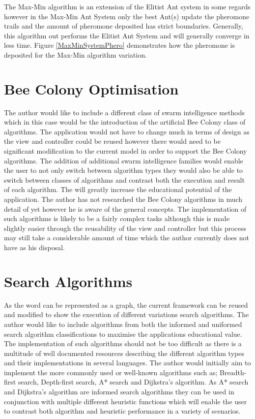 The Max-Min algorithm is an extension of the Elitist Ant system in some regards however in the Max-Min Ant System only the best Ant(s) update the pheromone trails and the amount of pheromone deposited has strict boundaries. Generally, this algorithm out performs the Elitist Ant System and will generally converge in less time. Figure \ref{MaxMinSystemPhero} demonstrates how the pheromone is deposited for the Max-Min algorithm variation.

\section{Bee Colony Optimisation}

The author would like to include a different class of swarm intelligence methods which in this case would be the introduction of the artificial Bee Colony class of algorithms. The application would not have to change much in terms of design as the view and controller could be reused however there would need to be significant modification to the current model in order to support the Bee Colony algorithms. The addition of additional swarm intelligence families would enable the user to not only switch between algorithm types they would also be able to switch between classes of algorithms and contrast both the execution and result of each algorithm. The will greatly increase the educational potential of the application. The author has not researched the Bee Colony algorithms in much detail of yet however he is aware of the general concepts. The implementation of such algorithms is likely to be a fairly complex tasks although this is made slightly easier through the reusability of the view and controller but this process may still take a considerable amount of time which the author currently does not have as his disposal.

\section{Search Algorithms}

As the word can be represented as a graph, the current framework can be reused and modified to show the execution of different variations search algorithms. The author would like to include algorithms from both the informed and uniformed search algorithm classifications to maximise the applications educational value. The implementation of such algorithms should not be too difficult as there is a multitude of well documented resources describing the different algorithm types and their implementations in several languages. The author would initially aim to implement the more commonly used or well-known algorithms such as; Breadth-first search, Depth-first search, A* search and Dijkstra's algorithm. As A* search and Dijkstra's algorithm are informed search algorithms they can be used in conjunction with multiple different heuristic functions which will enable the user to contrast both algorithm and heuristic performance in a variety of scenarios.

